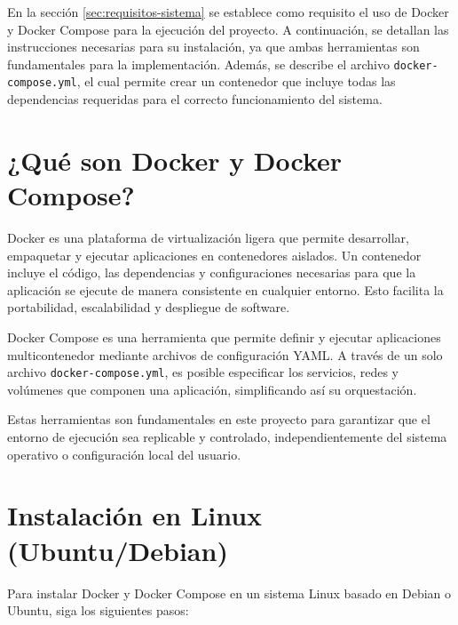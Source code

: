 \label{anexo:docker}

En la sección \ref{sec:requisitos-sistema} se establece como requisito el uso de Docker y Docker Compose para la ejecución del proyecto. A continuación, se detallan las instrucciones necesarias para su instalación, ya que ambas herramientas son fundamentales para la implementación. Además, se describe el archivo \texttt{docker-compose.yml}, el cual permite crear un contenedor que incluye todas las dependencias requeridas para el correcto funcionamiento del sistema.

\section{¿Qué son Docker y Docker Compose?}
Docker es una plataforma de virtualización ligera que permite desarrollar, empaquetar y ejecutar aplicaciones en contenedores aislados. Un contenedor incluye el código, las dependencias y configuraciones necesarias para que la aplicación se ejecute de manera consistente en cualquier entorno. Esto facilita la portabilidad, escalabilidad y despliegue de software.

Docker Compose es una herramienta que permite definir y ejecutar aplicaciones multicontenedor mediante archivos de configuración YAML. A través de un solo archivo \texttt{docker-compose.yml}, es posible especificar los servicios, redes y volúmenes que componen una aplicación, simplificando así su orquestación.

Estas herramientas son fundamentales en este proyecto para garantizar que el entorno de ejecución sea replicable y controlado, independientemente del sistema operativo o configuración local del usuario.

\section{Instalación en Linux (Ubuntu/Debian)}

Para instalar Docker y Docker Compose en un sistema Linux basado en Debian o Ubuntu, siga los siguientes pasos:

